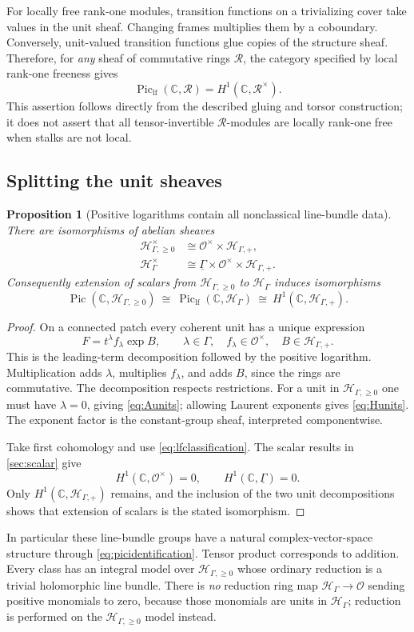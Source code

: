 \documentclass[11pt,letterpaper]{article}
\newtheorem{proposition}[theorem]{Proposition}
\theoremstyle{definition}
\theoremstyle{remark}
\newcommand{\C}{\mathbb C}
\newcommand{\OO}{\mathcal O}
\newcommand{\HH}{\mathscr H_\Gamma}
\newcommand{\HP}{\mathscr H_{\Gamma,+}}
\newcommand{\HA}{\mathscr H_{\Gamma,\ge0}}
\newcommand{\Piclf}{\operatorname{Pic}_{\mathrm{lf}}}
\numberwithin{equation}{section}
\begin{document}
For locally free rank-one modules, transition functions on a trivializing cover take values in the unit sheaf. Changing frames multiplies them by a coboundary. Conversely, unit-valued transition functions glue copies of the structure sheaf. Therefore, for \emph{any} sheaf of commutative rings $\mathscr R$, the category specified by local rank-one freeness gives
\begin{equation}\label{eq:lfclassification}
 \Piclf(\C,\mathscr R)=H^1(\C,\mathscr R^\times).
\end{equation}
This assertion follows directly from the described gluing and torsor construction; it does not assert that all tensor-invertible $\mathscr R$-modules are locally rank-one free when stalks are not local.

\subsection{Splitting the unit sheaves}
\begin{proposition}[Positive logarithms contain all nonclassical line-bundle data]\label{prop:picidentification}
There are isomorphisms of abelian sheaves
\begin{align}
 \HA^\times&\cong\OO^\times\times\HP,\label{eq:Aunits}\\
 \HH^\times&\cong\underline\Gamma\times\OO^\times\times\HP.\label{eq:Hunits}
\end{align}
Consequently extension of scalars from $\HA$ to $\HH$ induces isomorphisms
\begin{equation}\label{eq:picidentification}
 \operatorname{Pic}(\C,\HA)
 \ \cong\ \Piclf(\C,\HH)
 \ \cong\ H^1(\C,\HP).
\end{equation}
\end{proposition}
\begin{proof}
On a connected patch every coherent unit has a unique expression
\[
 F=t^\lambda f_\lambda\exp B,
 \qquad \lambda\in\Gamma,\quad
 f_\lambda\in\OO^\times,\quad B\in\HP.
\]
This is the leading-term decomposition followed by the positive logarithm. Multiplication adds $\lambda$, multiplies $f_\lambda$, and adds $B$, since the rings are commutative. The decomposition respects restrictions. For a unit in $\HA$ one must have $\lambda=0$, giving \eqref{eq:Aunits}; allowing Laurent exponents gives \eqref{eq:Hunits}. The exponent factor is the constant-group sheaf, interpreted componentwise.

Take first cohomology and use \eqref{eq:lfclassification}. The scalar results in \cref{sec:scalar} give
\[
 H^1(\C,\OO^\times)=0,\qquad
 H^1(\C,\underline\Gamma)=0.
\]
Only $H^1(\C,\HP)$ remains, and the inclusion of the two unit decompositions shows that extension of scalars is the stated isomorphism.
\end{proof}
In particular these line-bundle groups have a natural complex-vector-space structure through \eqref{eq:picidentification}. Tensor product corresponds to addition. Every class has an integral model over $\HA$ whose ordinary reduction is a trivial holomorphic line bundle. There is \emph{no} reduction ring map $\HH\to\OO$ sending positive monomials to zero, because those monomials are units in $\HH$; reduction is performed on the $\HA$ model instead.
\end{document}
